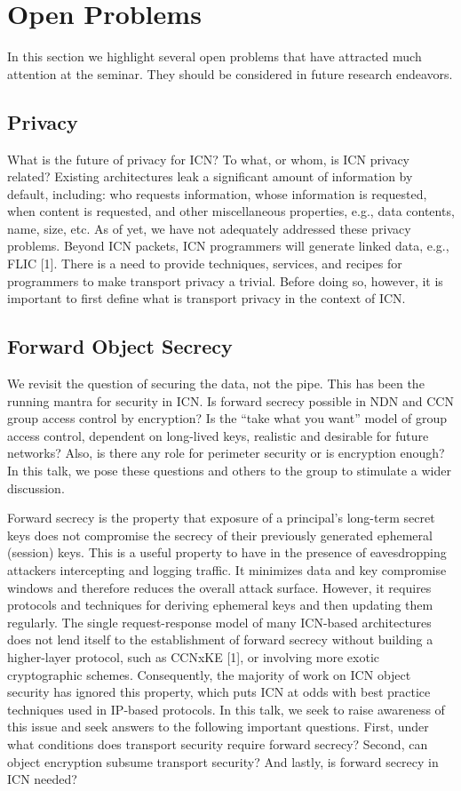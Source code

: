 \section{Open Problems}
\label{sec:open-problems}

In this section we highlight several open problems that have attracted much attention at the
seminar. They should be considered in future research endeavors.

\subsection{Privacy}
What is the future of privacy for ICN? To what, or whom, is ICN privacy related?
Existing architectures leak a significant amount of information by default,
including: who requests information, whose information is requested, when content
is requested, and other miscellaneous properties, e.g., data contents, name, size,
etc. As of yet, we have not adequately addressed these privacy problems.
Beyond ICN packets, ICN programmers will generate linked data, e.g., FLIC [1]. There is a need to
 provide techniques, services, and recipes for programmers to make transport
privacy a trivial. Before doing so, however, it is important to first define what is transport
privacy in the context of ICN.

\subsection{Forward Object Secrecy} %
We revisit the question of securing the data, not the pipe. This has been the
running mantra for security in ICN. Is forward secrecy possible in NDN and CCN
group access control by encryption? Is the ``take what you want'' model of group
access control, dependent on long-lived keys, realistic and desirable for future networks?
 Also, is there any role for perimeter security or is encryption
enough? In this talk, we pose these questions and others to the group to stimulate
a wider discussion.

Forward secrecy is the property that exposure of a principal's long-term secret keys
does not compromise the secrecy of their previously generated ephemeral (session)
keys. This is a useful property to have in the presence of eavesdropping attackers
intercepting and logging traffic. It minimizes data and key compromise windows and
therefore reduces the overall attack surface. However, it requires protocols and
techniques for deriving ephemeral keys and then updating them regularly. The single
request-response model of many ICN-based architectures does not lend itself to the
establishment of forward secrecy without building a higher-layer protocol, such as
CCNxKE [1], or involving more exotic cryptographic schemes. Consequently, the
majority of work on ICN object security has ignored this property, which puts ICN
at odds with best practice techniques used in IP-based protocols. In this talk, we
seek to raise awareness of this issue and seek answers to the following important
questions. First, under what conditions does transport security require forward
secrecy? Second, can object encryption subsume transport security? And lastly, is
forward secrecy in ICN needed?

